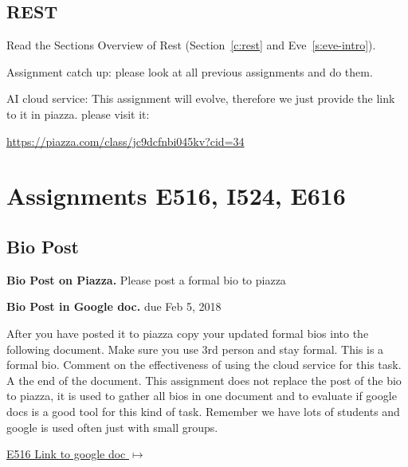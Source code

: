 \subsection{REST}
\begin{exercise}
Read the Sections Overview of Rest (Section~\ref{c:rest} and Eve~\ref{s:eve-intro}).
\end{exercise}

\begin{exercise}
Assignment catch up: please look at all previous assignments and do
them. 
\end{exercise}

\begin{exercise}

AI cloud service: This assignment will evolve, therefore we just
provide the link to it in piazza. please visit it:

\url{https://piazza.com/class/jc9dcfnbi045kv?cid=34}
\end{exercise}

\section{Assignments E516, I524, E616}
\label{s:616-assignments}

\subsection{Bio Post}\label{a:616-bio}

\begin{exercise}\label{E:616-bio-piazza}
{\bf Bio Post on Piazza.} Please post a formal bio to piazza
\end{exercise}

\begin{exercise} \label{E:616-bio-googledocs}

  {\bf Bio Post in Google doc.} due Feb 5, 2018
  
  After you have posted it to piazza
  copy your updated formal bios into the following document.  Make
  sure you use 3rd person and stay formal. This is a formal
  bio. Comment on the effectiveness of using the cloud service for
  this task. A the end of the document. This assignment does not
  replace the post of the bio to piazza, it is used to gather all bios
  in one document and to evaluate if google docs is a good tool for
  this kind of task. Remember we have lots of students and google is
  used often just with small groups.
 
 \smallskip

 {\hfill \href{https://docs.google.com/document/d/1ejzlKYqC3dLac8WXVpcPQsJh1j4BDqRxxgGg1cFQbeQ/edit?usp=sharing}{E516 Link to google doc $\mapsto$}}

 \end{exercise}

